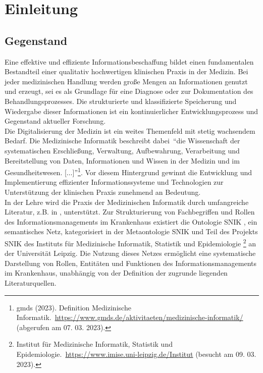 \chapter{Einleitung}\label{ch:introduction}
\section{Gegenstand}\label{sec:gegenstand}
Eine effektive und effiziente Informationsbeschaffung bildet einen fundamentalen Bestandteil einer qualitativ hochwertigen klinischen Praxis in der Medizin. 
Bei jeder medizinischen Handlung werden große Mengen an Informationen genutzt und erzeugt, sei es als Grundlage für eine Diagnose oder zur Dokumentation des Behandlungsprozesses. 
Die strukturierte und klassifizierte Speicherung und Wiedergabe dieser Informationen ist ein kontinuierlicher Entwicklungsprozess und Gegenstand aktueller Forschung.\\

Die Digitalisierung der Medizin ist ein weites Themenfeld mit stetig wachsendem Bedarf. 
Die Medizinische Informatik beschreibt dabei~\enquote{die Wissenschaft der systematischen Erschließung, Verwaltung, Aufbewahrung, Verarbeitung und Bereitstellung von Daten, Informationen und Wissen in der Medizin und im Gesundheitswesen. [$\dots$]}\footnote{\raggedright{}\ac{gmds} (2023). Definition Medizinische Informatik.\ \url{https://www.gmds.de/aktivitaeten/medizinische-informatik/} (abgerufen am 07. 03. 2023).}.
Vor diesem Hintergrund gewinnt die Entwicklung und Implementierung effizienter Informationssysteme und Technologien zur Unterstützung der klinischen Praxis zunehmend an Bedeutung.\\

In der Lehre wird die Praxis der Medizinischen Informatik durch umfangreiche Literatur, z.B. in \citet{bb}, unterstützt.
Zur Strukturierung von Fachbegriffen und Rollen des Informationsmanagements im Krankenhaus existiert die Ontologie SNIK \citep{semantischesnetz}, ein semantisches Netz, kategorisiert in der Metaontologie SNIK und Teil des Projekts SNIK des Instituts für Medizinische Informatik, Statistik und Epidemiologie%
\footnote{\raggedright{}Institut für Medizinische Informatik, Statistik und Epidemiologie.\ \url{https://www.imise.uni-leipzig.de/Institut} (besucht am 09. 03. 2023).} an der Universität Leipzig.
Die Nutzung dieses Netzes ermöglicht eine systematische Darstellung von Rollen, Entitäten und Funktionen des Informationsmanagements im Krankenhaus, unabhängig von der Definition der zugrunde liegenden Literaturquellen.\\

